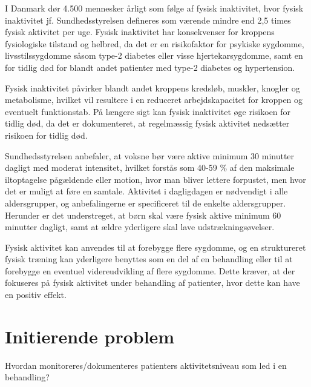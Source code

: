 I Danmark dør 4.500 mennesker årligt som følge af fysisk inaktivitet, hvor fysisk inaktivitet jf. Sundhedsstyrelsen defineres som værende mindre end 2,5 times fysisk aktivitet per uge. \citep{aagaard2014} Fysisk inaktivitet har konsekvenser for kroppens fysiologiske tilstand og helbred, da det er en risikofaktor for psykiske sygdomme, livsstilssygdomme såsom type-2 diabetes eller visse hjertekarsygdomme, samt en for tidlig død for blandt andet patienter med type-2 diabetes og hypertension. \citep{motionsraad2007} 

Fysisk inaktivitet påvirker blandt andet kroppens kredsløb, muskler, knogler og metabolisme, hvilket vil resultere i en reduceret arbejdskapacitet for kroppen og eventuelt funktionstab. På længere sigt kan fysisk inaktivitet øge risikoen for tidlig død, da det er dokumenteret, at regelmæssig fysisk aktivitet nedsætter risikoen for tidlig død. \citep{motionsraad2007}

Sundhedsstyrelsen anbefaler, at voksne bør være aktive minimum 30 minutter dagligt med moderat intensitet, hvilket forstås som 40-59 $\%$ af den maksimale iltoptagelse pågældende eller motion, hvor man bliver lettere forpustet, men hvor det er muligt at føre en samtale.
Aktivitet i dagligdagen er nødvendigt i alle aldersgrupper, og anbefalingerne er specificeret til de enkelte aldersgrupper. Herunder er det understreget, at børn skal være fysisk aktive minimum 60 minutter dagligt, samt at ældre yderligere skal lave udstrækningsøvelser. \citep{pedersen2011}

Fysisk aktivitet kan anvendes til at forebygge flere sygdomme, og en struktureret fysisk træning kan yderligere benyttes som en del af en behandling eller til at forebygge en eventuel videreudvikling af flere sygdomme. \citep{motionsraad2007} Dette kræver, at der fokuseres på fysisk aktivitet under behandling af patienter, hvor dette kan have en positiv effekt.



\section{Initierende problem}
Hvordan monitoreres/dokumenteres patienters aktivitetsniveau som led i en behandling?  
